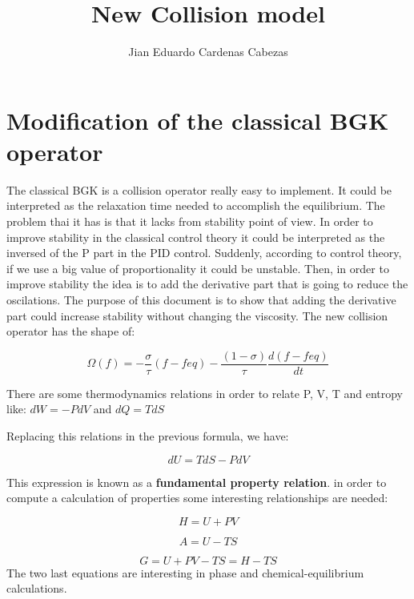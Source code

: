 \documentclass{article}
\title{\textbf{New Collision model}}
\author{Jian Eduardo Cardenas Cabezas}
\begin{document}
\maketitle

\section{Modification of the classical BGK operator}
The classical BGK is a collision operator really easy to implement. It could be interpreted as the relaxation time needed to accomplish the equilibrium. The problem thai it has is that it lacks from stability point of view. In order to improve stability
in the classical control theory it could be interpreted as the inversed of the P part in the PID control. Suddenly, according to control theory, if we use a big value of proportionality 
it could be unstable. Then, in order to improve stability the idea is to add the derivative part that is going to reduce the oscilations. The purpose of this document is to  
show that adding the derivative part could increase stability without changing the viscosity.
The new collision operator has the shape of:

\begin{equation}
    \Omega(f) = -\frac{\sigma}{\tau}(f-feq) - \frac{(1-\sigma)}{\tau}\frac{d(f-feq)}{dt}    
\end{equation}

There are some thermodynamics relations in order to relate P, V, T and entropy like: $dW = -PdV$ and $dQ = TdS$

Replacing this relations in the previous formula, we have: 

\begin{equation}
    dU = TdS - PdV
\end{equation}

This expression is known as a \textbf{fundamental property relation}. in order to compute a calculation of properties some interesting relationships are needed:

\begin{equation}
    H = U + PV
\end{equation}

 \begin{equation*}
     A = U - TS
 \end{equation*}

  \begin{equation*}
     G = U +PV - TS = H - TS
 \end{equation*}
The two last equations are interesting in phase and chemical-equilibrium calculations. 
\end{document}
